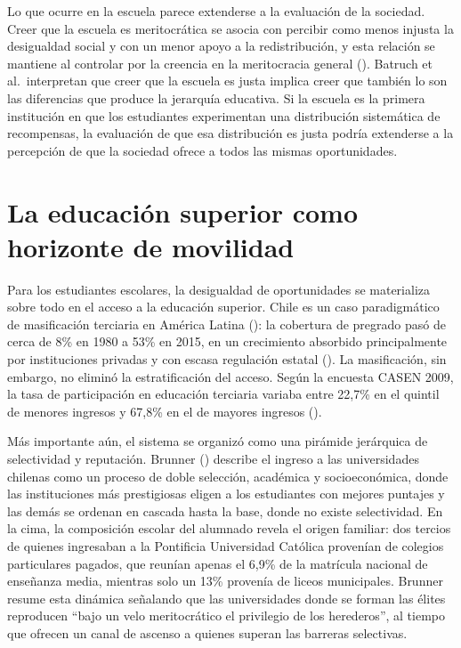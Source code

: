 \documentclass[
  spanish,
  a4paper,
  oneside]{scrbook}
\begin{document}
Lo que ocurre en la escuela parece extenderse a la evaluación de la
sociedad. Creer que la escuela es meritocrática se asocia con percibir
como menos injusta la desigualdad social y con un menor apoyo a la
redistribución, y esta relación se mantiene al controlar por la creencia
en la meritocracia general (). Batruch et al.~interpretan que creer que la escuela es
justa implica creer que también lo son las diferencias que produce la
jerarquía educativa. Si la escuela es la primera institución en que los
estudiantes experimentan una distribución sistemática de recompensas, la
evaluación de que esa distribución es justa podría extenderse a la
percepción de que la sociedad ofrece a todos las mismas oportunidades.

\section{La educación superior como horizonte de
movilidad}\label{la-educaciuxf3n-superior-como-horizonte-de-movilidad}

Para los estudiantes escolares, la desigualdad de oportunidades se
materializa sobre todo en el acceso a la educación superior. Chile es un
caso paradigmático de masificación terciaria en América Latina
(): la
cobertura de pregrado pasó de cerca de 8\% en 1980 a 53\% en 2015, en un
crecimiento absorbido principalmente por instituciones privadas y con
escasa regulación estatal
().
La masificación, sin embargo, no eliminó la estratificación del acceso.
Según la encuesta CASEN 2009, la tasa de participación en educación
terciaria variaba entre 22,7\% en el quintil de menores ingresos y
67,8\% en el de mayores ingresos
().

Más importante aún, el sistema se organizó como una pirámide jerárquica
de selectividad y reputación. Brunner
() describe el ingreso a las
universidades chilenas como un proceso de doble selección, académica y
socioeconómica, donde las instituciones más prestigiosas eligen a los
estudiantes con mejores puntajes y las demás se ordenan en cascada hasta
la base, donde no existe selectividad. En la cima, la composición
escolar del alumnado revela el origen familiar: dos tercios de quienes
ingresaban a la Pontificia Universidad Católica provenían de colegios
particulares pagados, que reunían apenas el 6,9\% de la matrícula
nacional de enseñanza media, mientras solo un 13\% provenía de liceos
municipales. Brunner resume esta dinámica señalando que las
universidades donde se forman las élites reproducen ``bajo un velo
meritocrático el privilegio de los herederos'', al tiempo que ofrecen un
canal de ascenso a quienes superan las barreras selectivas.
\end{document}
